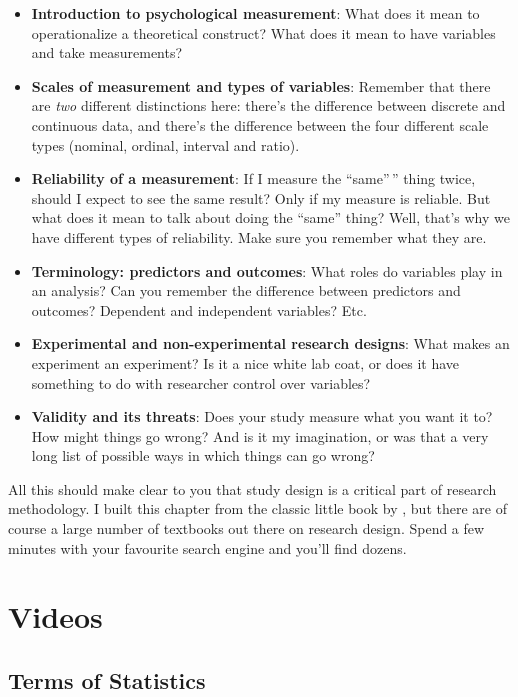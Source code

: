 \documentclass[
]{book}
\begin{document}
\begin{itemize}
\item
  \textbf{Introduction to psychological measurement}: What does it mean to operationalize a theoretical construct? What does it mean to have variables and take measurements?
\item
  \textbf{Scales of measurement and types of variables}: Remember that there are \emph{two} different distinctions here: there's the difference between discrete and continuous data, and there's the difference between the four different scale types (nominal, ordinal, interval and ratio).
\item
  \textbf{Reliability of a measurement}: If I measure the ``same''\,'' thing twice, should I expect to see the same result? Only if my measure is reliable. But what does it mean to talk about doing the ``same'' thing? Well, that's why we have different types of reliability. Make sure you remember what they are.
\item
  \textbf{Terminology: predictors and outcomes}: What roles do variables play in an analysis? Can you remember the difference between predictors and outcomes? Dependent and independent variables? Etc.
\item
  \textbf{Experimental and non-experimental research designs}: What makes an experiment an experiment? Is it a nice white lab coat, or does it have something to do with researcher control over variables?
\item
  \textbf{Validity and its threats}: Does your study measure what you want it to? How might things go wrong? And is it my imagination, or was that a very long list of possible ways in which things can go wrong?
\end{itemize}

All this should make clear to you that study design is a critical part of research methodology. I built this chapter from the classic little book by \citet{Campbell1963}, but there are of course a large number of textbooks out there on research design. Spend a few minutes with your favourite search engine and you'll find dozens.

\section{Videos}\label{videos}

\subsection{Terms of Statistics}\label{terms-of-statistics}
\end{document}

